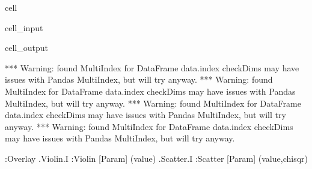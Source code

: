 \documentclass[letterpaper,table,10pt,english]{jupyterBook}
\begin{document}
\begin{sphinxuseclass}{cell}
\begin{sphinxVerbatimInput}
\begin{sphinxuseclass}{cell_input}
\begin{sphinxVerbatim}[commandchars=\\\{\}]
         
     

\end{sphinxVerbatim}

\end{sphinxuseclass}\end{sphinxVerbatimInput}
\begin{sphinxVerbatimOutput}

\begin{sphinxuseclass}{cell_output}
\begin{sphinxVerbatim}[commandchars=\\\{\}]
*** Warning: found MultiIndex for DataFrame data.index \PYGZhy{} checkDims may have issues with Pandas MultiIndex, but will try anyway.
*** Warning: found MultiIndex for DataFrame data.index \PYGZhy{} checkDims may have issues with Pandas MultiIndex, but will try anyway.
*** Warning: found MultiIndex for DataFrame data.index \PYGZhy{} checkDims may have issues with Pandas MultiIndex, but will try anyway.
*** Warning: found MultiIndex for DataFrame data.index \PYGZhy{} checkDims may have issues with Pandas MultiIndex, but will try anyway.
\end{sphinxVerbatim}

\begin{sphinxVerbatim}[commandchars=\\\{\}]
:Overlay
   .Violin.I  :Violin   [Param]   (value)
   .Scatter.I :Scatter   [Param]   (value,chisqr)
\end{sphinxVerbatim}


\end{sphinxuseclass}
\end{sphinxVerbatimOutput}
\end{sphinxuseclass}
\end{document}
